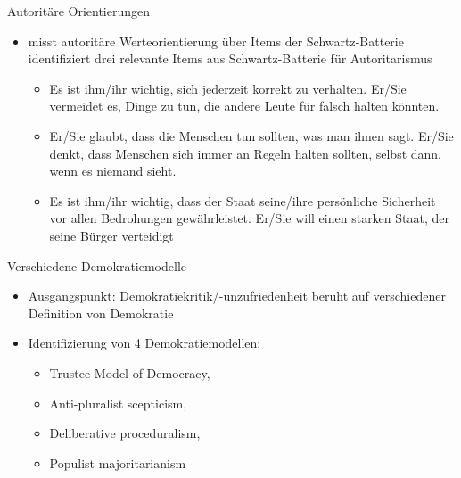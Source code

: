 \documentclass[11pt]{beamer}
\begin{document}
\begin{frame}{Autoritäre Orientierungen}
	\begin{itemize}
		\item \cite{Spier2010} misst autoritäre Werteorientierung über Items der Schwartz-Batterie identifiziert drei relevante Items aus Schwartz-Batterie für Autoritarismus
		\begin{itemize}
			\item Es ist ihm/ihr wichtig, sich jederzeit korrekt zu verhalten. Er/Sie vermeidet es, Dinge zu tun, die andere Leute für falsch halten könnten.
			\item Er/Sie glaubt, dass die Menschen tun sollten, was man ihnen sagt. Er/Sie denkt, dass Menschen sich immer an Regeln halten sollten, selbst dann, wenn es niemand sieht.
			\item Es ist ihm/ihr wichtig, dass der Staat seine/ihre persönliche Sicherheit vor allen Bedrohungen gewährleistet. Er/Sie will einen starken Staat, der seine Bürger verteidigt
		\end{itemize}
	\end{itemize}
\end{frame}

\begin{frame}{Verschiedene Demokratiemodelle}
	\begin{itemize}
		\item Ausgangspunkt: Demokratiekritik/-unzufriedenheit beruht auf verschiedener Definition von Demokratie
		\item Identifizierung von 4 Demokratiemodellen:
		\begin{itemize}
			\item Trustee Model of Democracy,
			\item Anti-pluralist scepticism,
			\item Deliberative proceduralism,
			\item Populist majoritarianism \parencite[792]{Landwehr2017}
		\end{itemize}
	\end{itemize}
\end{frame}
\end{document}
